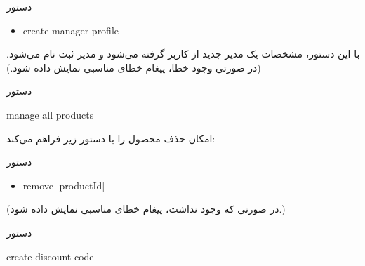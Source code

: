 \documentclass[]{article}
\begin{document}
\begin{mybox}[colback=brilliantlavender]{دستور}


\begin{latin}

\begin{itemize}[label = {$\Rightarrow$}]

\item
create manager profile

\end{itemize}

\end{latin}

\end{mybox}

با این دستور، مشخصات یک مدیر جدید از کاربر گرفته می‌شود و مدیر ثبت نام می‌شود.
(در صورتی وجود خطا، پیغام خطای مناسبی نمایش داده شود.)

\hrulefill


\begin{mybox}[colback=yellow]{دستور}

\begin{latin}

manage all products

\end{latin}

\end{mybox}


امکان حذف محصول را با دستور زیر فراهم می‌کند:


\begin{mybox}[colback=brilliantlavender]{دستور}


\begin{latin}

\begin{itemize}[label = {$\Rightarrow$}]

\item
remove [productId]

\end{itemize}

\end{latin}

\end{mybox}

(در صورتی که  وجود نداشت، پیغام خطای مناسبی نمایش داده شود.)


\hrulefill

\begin{mybox}[colback=yellow]{دستور}

\begin{latin}

create discount code

\end{latin}

\end{mybox}
\end{document}
